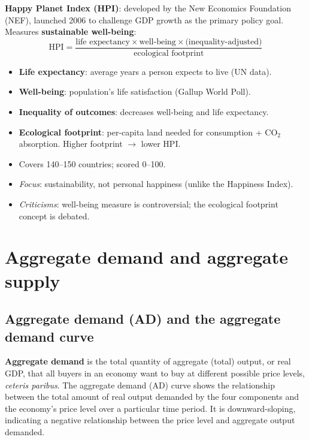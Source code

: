 \documentclass[a4paper,12pt]{article}
\newcommand{\needbold}[1]{\textcolor{red!70!black}{\textbf{#1}}}
\begin{document}
\textbf{Happy Planet Index (HPI)}: developed by the New Economics Foundation (NEF), launched 2006 to challenge GDP growth as the primary policy goal. Measures \textbf{sustainable well-being}:
\[
\text{HPI} = \frac{\text{life expectancy} \times \text{well-being} \times \text{(inequality-adjusted)}}{\text{ecological footprint}}
\]
\begin{itemize}
  \item \textbf{Life expectancy}: average years a person expects to live (UN data).
  \item \textbf{Well-being}: population's life satisfaction (Gallup World Poll).
  \item \textbf{Inequality of outcomes}: decreases well-being and life expectancy.
  \item \textbf{Ecological footprint}: per-capita land needed for consumption + CO$_2$ absorption. Higher footprint $\to$ lower HPI.
  \item Covers 140--150 countries; scored 0--100.
  \item \textit{Focus}: sustainability, not personal happiness (unlike the Happiness Index).
  \item \textit{Criticisms}: well-being measure is controversial; the ecological footprint concept is debated.
\end{itemize}
\section{Aggregate demand and aggregate supply}
\subsection{Aggregate demand (AD) and the aggregate demand curve}
\needbold{Aggregate demand} is the total quantity of aggregate (total) output, or real GDP, that all buyers in an economy want to buy at different possible price levels, \emph{ceteris paribus}.
The aggregate demand (AD) curve shows the relationship between the total amount of real output demanded by the four components and the economy's price level over a particular time period. It is downward-sloping, indicating a negative relationship between the price level and aggregate output demanded.
\end{document}
